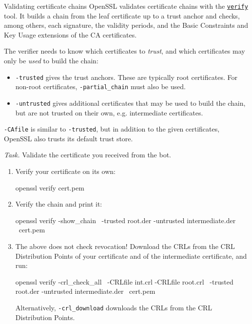 \documentclass{practice}
\begin{document}
\begin{task}{Validating certificate chains}
  OpenSSL validates certificate chains with the \href{https://docs.openssl.org/master/man1/openssl-verify/}{\texttt{verify}} tool.
  It builds a chain from the leaf certificate up to a trust anchor and checks, among others, each signature, the validity periods, and the Basic Constraints and Key Usage extensions of the CA certificates.

  The verifier needs to know which certificates to \emph{trust}, and which certificates may only be \emph{used} to build the chain:
  \begin{itemize}
    \item \texttt{-trusted} gives the trust anchors.
    These are typically root certificates.
    For non-root certificates, \texttt{-partial\_chain} must also be used.
    \item \texttt{-untrusted} gives additional certificates that may be used to build the chain, but are not trusted on their own, e.g. intermediate certificates.
  \end{itemize}
  \texttt{-CAfile} is similar to \texttt{-trusted}, but in addition to the given certificates, OpenSSL also trusts its default trust store.

  \textit{Task.}
  Validate the certificate you received from the bot.
  \begin{enumerate}
    \item Verify your certificate on its own:
    \begin{cmdblock}
openssl verify cert.pem
    \end{cmdblock}

    \item Verify the chain and print it:
    \begin{cmdblock}
openssl verify -show_chain \
  -trusted root.der -untrusted intermediate.der \
  cert.pem
    \end{cmdblock}

    \item The above does not check revocation!
    Download the CRLs from the CRL Distribution Points of your certificate and of the intermediate certificate, and run:
    \begin{cmdblock}
openssl verify -crl_check_all \
  -CRLfile int.crl -CRLfile root.crl \
  -trusted root.der -untrusted intermediate.der \
  cert.pem
    \end{cmdblock}
    Alternatively, \texttt{-crl\_download} downloads the CRLs from the CRL Distribution Points.


\end{enumerate}
\end{task}
\end{document}
